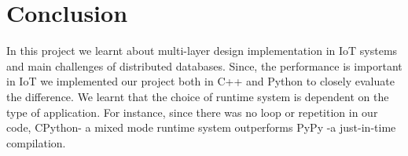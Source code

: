 \section{Conclusion}
\label{sec:Conclusion}
In this project we learnt about multi-layer design implementation in IoT systems and main challenges of distributed databases. Since, the performance is important in IoT we implemented our project both in C++ and Python to closely evaluate the difference. We learnt that the choice of runtime system is dependent on the type of application. For instance, since there was no loop or repetition in our code, CPython- a mixed mode runtime system outperforms PyPy -a  just-in-time compilation.
